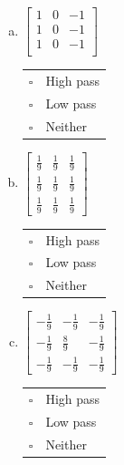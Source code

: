 \begin{enumerate}[(a)]
\item
 $\begin{bmatrix}
    1 & 0 & -1 \\
    1 & 0 & -1 \\
    1 & 0 & -1 \\
 \end{bmatrix}$
\begin{tabular}[h]{ll}
$\square$ & High pass \\
$\square$ & Low pass \\
$\square$ & Neither \\
\end{tabular}

\item
 $\begin{bmatrix}
    \frac{1}{9} & \frac{1}{9} & \frac{1}{9} \\
    \frac{1}{9} & \frac{1}{9} & \frac{1}{9} \\
    \frac{1}{9} & \frac{1}{9} & \frac{1}{9}
 \end{bmatrix}$
\begin{tabular}[h]{ll}
$\square$ & High pass \\
$\square$ & Low pass \\
$\square$ & Neither \\
\end{tabular}

\item
$\begin{bmatrix}
    -\frac{1}{9} & -\frac{1}{9} & -\frac{1}{9} \\
    -\frac{1}{9} & \frac{8}{9} & -\frac{1}{9} \\
    -\frac{1}{9} & -\frac{1}{9} & -\frac{1}{9}
  \end{bmatrix}$
\begin{tabular}[h]{ll}
$\square$ & High pass \\
$\square$ & Low pass \\
$\square$ & Neither \\
\end{tabular}


\end{enumerate}
